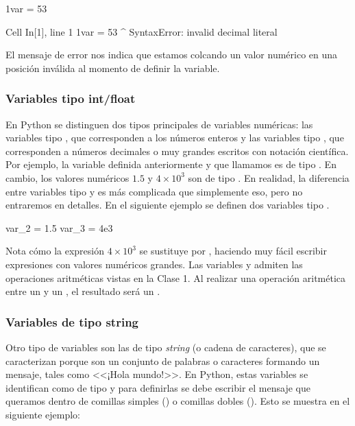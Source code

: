 \begin{pyin}
1var = 53
\end{pyin}

\begin{pyerror}
    Cell In[1], line 1
    1var = 53
    ^
SyntaxError: invalid decimal literal    
\end{pyerror}

El mensaje de error nos indica que estamos colcando un valor numérico en una posición inválida al momento de definir la variable.

\subsubsection{Variables tipo int/float}

En Python se distinguen dos tipos principales de variables numéricas: las variables tipo , que corresponden a los números enteros y las variables tipo , que corresponden a números decimales o muy grandes escritos con notación científica. Por ejemplo, la variable definida anteriormente y que llamamos  es de tipo . En cambio, los valores numéricos \(1.5\) y \(4 \times 10^{3}\) son de tipo . En realidad, la diferencia entre variables tipo  y  es más complicada que simplemente eso, pero no entraremos en detalles. En el siguiente ejemplo se definen dos variables tipo .

\begin{pyin}
var_2 = 1.5
var_3 = 4e3
\end{pyin}

Nota cómo la expresión \(4 \times 10^{3}\) se sustituye por , haciendo muy fácil escribir expresiones con valores numéricos grandes. Las variables  y  admiten las operaciones aritméticas vistas en la Clase 1. Al realizar una operación aritmética entre un  y un , el resultado será un .

\subsubsection{Variables de tipo string}
Otro tipo de variables son las de tipo \emph{string} (o cadena de caracteres), que se caracterizan porque son un conjunto de palabras o caracteres formando un mensaje, tales como <<¡Hola mundo!>>. En Python, estas variables se identifican como de tipo  y para definirlas se debe escribir el mensaje que queramos dentro de comillas simples () o comillas dobles (). Esto se muestra en el siguiente ejemplo:

